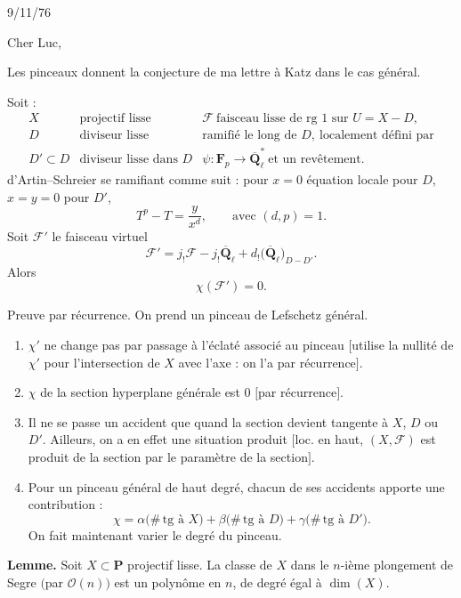 \documentclass[11pt]{article}
\newcommand{\F}{\mathcal F}
\newcommand{\Qell}{\overline{\mathbf Q}_{\ell}}
\newcommand{\Fp}{\mathbf F_p}
\newcommand{\OO}{\mathcal O}
\newcommand{\PP}{\mathbf P}
\newcommand{\tg}{\mathrm{tg}}
\begin{document}
\thispagestyle{empty}

\noindent\hfill 9/11/76

\vspace{1.1em}

Cher Luc,

Les pinceaux donnent la conjecture de ma lettre à Katz dans le cas général.

Soit :
\[
\begin{array}{rll}
X & \text{projectif lisse} & \F\ \text{faisceau lisse de rg }1\text{ sur }U=X-D,\\[0.3em]
D & \text{diviseur lisse} & \text{ramifié le long de }D,\ \text{localement défini par}\\[0.3em]
D'\subset D & \text{diviseur lisse dans }D & \psi\colon \Fp\longrightarrow \Qell^{\ast}\ \text{et un revêtement.}
\end{array}
\]
d'Artin--Schreier se ramifiant comme suit : pour \(x=0\) équation locale pour \(D\), \(x=y=0\) pour \(D'\),
\[
T^p-T=\frac{y}{x^d},\qquad \text{avec }(d,p)=1.
\]
Soit \(\F'\) le faisceau virtuel
\[
\F'=j_!\F-j_!\Qell+d_!\bigl(\Qell\bigr)_{D-D'}.
\]
Alors
\[
\chi(\F')=0.
\]

Preuve par récurrence. On prend un pinceau de Lefschetz général.

\begin{enumerate}[label=\alph*)]
\item \(\chi'\) ne change pas par passage à l'éclaté associé au pinceau \([\)utilise la nullité de \(\chi'\) pour l'intersection de \(X\) avec l'axe : on l'a par récurrence\(]\).

\item \(\chi\) de la section hyperplane générale est \(0\) \([\)par récurrence\(]\).

\item Il ne se passe un accident que quand la section devient tangente à \(X\), \(D\) ou \(D'\). Ailleurs, on a en effet une situation produit \([\)loc. en haut, \((X,\F)\) est produit de la section par le paramètre de la section\(]\).

\item Pour un pinceau général de haut degré, chacun de ses accidents apporte une contribution :
\[
\chi=\alpha\bigl(\#\,\tg\text{ à }X\bigr)
+\beta\bigl(\#\,\tg\text{ à }D\bigr)
+\gamma\bigl(\#\,\tg\text{ à }D'\bigr).
\]
On fait maintenant varier le degré du pinceau.
\end{enumerate}

\textbf{Lemme.} Soit \(X\subset\PP\) projectif lisse. La classe de \(X\) dans le \(n\)-ième plongement de Segre \((\)par \(\OO(n)\)\()\) est un polynôme en \(n\), de degré égal à \(\dim(X)\).
\end{document}
